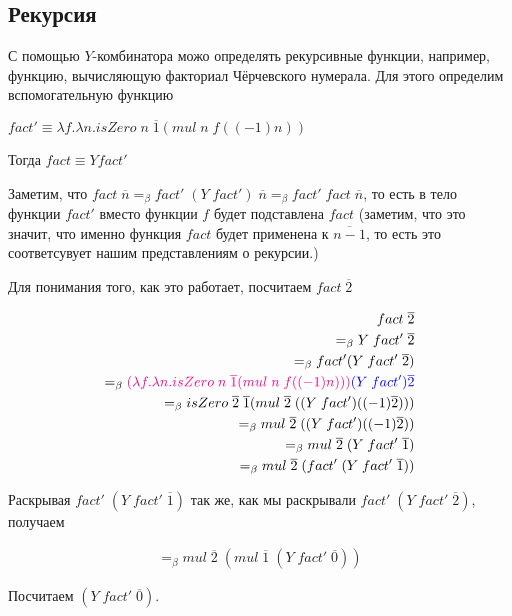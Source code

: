 \subsection{Рекурсия}

С помощью $Y$-комбинатора можо определять рекурсивные функции, например, функцию, вычисляющую факториал Чёрчевского нумерала. Для этого определим вспомогательную функцию

$fact' \equiv \lambda f. \lambda n. isZero\; n \; \overline{1} (mul \; n \; f((-1) n))$

Тогда $fact \equiv Y fact'$

Заметим, что $fact \; \overline{n} =_{\beta} fact' \; (Y \; fact') \; \overline{n} =_{\beta}fact' \; fact \; \overline{n} $, то есть в тело функции $fact'$ вместо функции $f$ будет подставлена $fact$ (заметим, что это значит, что именно функция $fact$ будет применена к $\overline{n - 1}$, то есть это соответсувует нашим представлениям о рекурсии.)

Для понимания того, как это работает, посчитаем $fact \; \overline{2}$

\begin{align*}
	fact \; \overline{2} \\ =_{\beta} Y \; fact' \; \overline{2}\\ =_{\beta} fact' (Y \; fact' \; \overline{2}) \\=_{\beta}\textcolor{magenta}{(\lambda f. \lambda n. isZero\; n \; \overline{1} (mul \; n \; f((-1) n)))} \textcolor{blue}{(Y \; fact') \overline{2}} \\
	=_{\beta}isZero\; \overline{2} \; \overline{1} (mul \; \overline{2} \; ((Y \; fact')((-1) \overline{2}))) \\ =_{\beta} mul \; \overline{2} \; ((Y \; fact')((-1) \overline{2})) \\ =_{\beta} mul \; \overline{2} \; (Y \; fact' \; \overline{1}) \\ =_{\beta} mul \; \overline{2} \; (fact' \;(Y \; fact' \; \overline{1}))
\end{align*}

Раскрывая $fact' \;(Y \; fact' \; \overline{1})$ так же, как мы раскрывали  $fact' \;(Y \; fact' \; \overline{2})$, получаем

\begin{align*}
	=_{\beta} mul \; \overline{2} \; (mul \; \overline{1} \; (Y \; fact' \; \overline{0}))
\end{align*}

Посчитаем $(Y \; fact' \; \overline{0})$.

